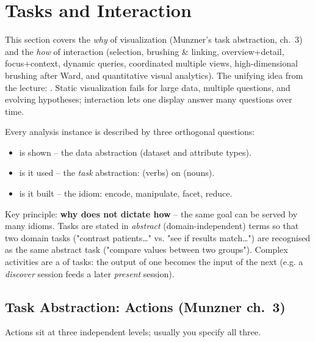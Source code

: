 \section{Tasks and Interaction}

This section covers the \emph{why} of visualization (Munzner's task abstraction, ch.~3) and the \emph{how} of interaction (selection, brushing \& linking, overview+detail, focus+context, dynamic queries, coordinated multiple views, high-dimensional brushing after Ward, and quantitative visual analytics). The unifying idea from the lecture: . Static visualization fails for large data, multiple questions, and evolving hypotheses; interaction lets one display answer many questions over time.

\begin{keybox}
Every analysis instance is described by three orthogonal questions:
\begin{itemize}
  \item {} is shown -- the data abstraction (dataset and attribute types).
  \item {} is it used -- the \emph{task} abstraction:  (verbs) on  (nouns).
  \item {} is it built -- the idiom: encode, manipulate, facet, reduce.
\end{itemize}
Key principle: \textbf{why does not dictate how} -- the same goal can be served by many idioms. Tasks are stated in \emph{abstract} (domain-independent) terms so that two domain tasks ("contrast patients\dots" vs. "see if results match\dots") are recognised as the same abstract task ("compare values between two groups"). Complex activities are a  of tasks: the output of one becomes the input of the next (e.g. a \emph{discover} session feeds a later \emph{present} session).
\end{keybox}

\subsection{Task Abstraction: Actions (Munzner ch.~3)}

Actions sit at three independent levels; usually you specify all three.

